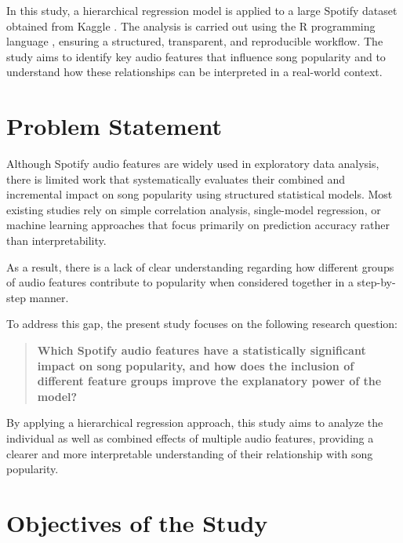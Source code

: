 \documentclass[12pt,a4paper]{article}
\begin{document}
In this study, a hierarchical regression model is applied to a large
Spotify dataset obtained from Kaggle \citep{kaggle_spotify}. The analysis is carried out using
the R programming language \citep{rcoreteam2023}, ensuring a structured, transparent, and
reproducible workflow. The study aims to identify key audio features that
influence song popularity and to understand how these relationships can
be interpreted in a real-world context.
\section{Problem Statement}

Although Spotify audio features are widely used in exploratory data
analysis, there is limited work that systematically evaluates their
combined and incremental impact on song popularity using structured
statistical models. Most existing studies rely on simple correlation
analysis, single-model regression, or machine learning approaches that
focus primarily on prediction accuracy rather than interpretability.

As a result, there is a lack of clear understanding regarding how
different groups of audio features contribute to popularity when
considered together in a step-by-step manner.

To address this gap, the present study focuses on the following research
question:

\begin{quote}
\textbf{Which Spotify audio features have a statistically significant
impact on song popularity, and how does the inclusion of different
feature groups improve the explanatory power of the model?}
\end{quote}

By applying a hierarchical regression approach, this study aims to
analyze the individual as well as combined effects of multiple audio
features, providing a clearer and more interpretable understanding of
their relationship with song popularity.
\section{Objectives of the Study}
\end{document}
